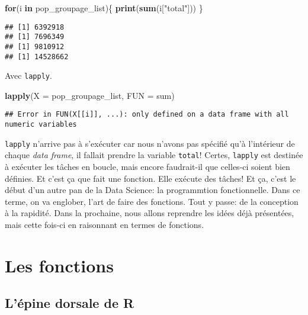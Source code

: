 \documentclass[]{book}
\newenvironment{Shaded}{\begin{snugshade}}{\end{snugshade}}
\newcommand{\KeywordTok}[1]{\textcolor[rgb]{0.13,0.29,0.53}{\textbf{#1}}}
\newcommand{\DataTypeTok}[1]{\textcolor[rgb]{0.13,0.29,0.53}{#1}}
\newcommand{\StringTok}[1]{\textcolor[rgb]{0.31,0.60,0.02}{#1}}
\newcommand{\ControlFlowTok}[1]{\textcolor[rgb]{0.13,0.29,0.53}{\textbf{#1}}}
\newcommand{\NormalTok}[1]{#1}
\begin{document}
\begin{Shaded}
\begin{Highlighting}[]
\ControlFlowTok{for}\NormalTok{(i }\ControlFlowTok{in}\NormalTok{ pop_groupage_list)\{}
  \KeywordTok{print}\NormalTok{(}\KeywordTok{sum}\NormalTok{(i[}\StringTok{"total"}\NormalTok{]))}
\NormalTok{  \}}
\end{Highlighting}
\end{Shaded}

\begin{verbatim}
## [1] 6392918
## [1] 7696349
## [1] 9810912
## [1] 14528662
\end{verbatim}

Avec \texttt{lapply}.

\begin{Shaded}
\begin{Highlighting}[]
\KeywordTok{lapply}\NormalTok{(}\DataTypeTok{X =}\NormalTok{ pop_groupage_list, }\DataTypeTok{FUN =}\NormalTok{ sum)}
\end{Highlighting}
\end{Shaded}

\begin{verbatim}
## Error in FUN(X[[i]], ...): only defined on a data frame with all numeric variables
\end{verbatim}

\texttt{lapply} n'arrive pas à s'exécuter car nous n'avons pas spécifié
qu'à l'intérieur de chaque \emph{data frame}, il fallait prendre la
variable \texttt{total}! Certes, \texttt{lapply} est destinée à exécuter
les tâches en boucle, mais encore faudrait-il que celles-ci soient bien
définies. Et c'est ça que fait une fonction. Elle exécute des tâches! Et
ça, c'est le début d'un autre pan de la Data Science: la programmtion
fonctionnelle. Dans ce terme, on va englober, l'art de faire des
fonctions. Tout y passe: de la conception à la rapidité. Dans la
prochaine, nous allons reprendre les idées déjà présentées, mais cette
fois-ci en raisonnant en termes de fonctions.

\section{Les fonctions}\label{les-fonctions}

\subsection{L'épine dorsale de R}\label{lepine-dorsale-de-r}
\end{document}
